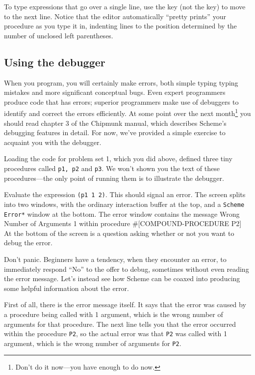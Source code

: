 To type expressions that go over a single line, use the 
key (not the  key) to move to the next line.  Notice that
the editor automatically ``pretty prints'' your procedure as you type
it in, indenting lines to the position determined by the number of
unclosed left parentheses.

\subsection{Using the debugger}

When you program, you will certainly make errors, both simple typing
typing mistakes and more significant conceptual bugs.  Even expert
programmers produce code that has errors; superior programmers make
use of debuggers to identify and correct the errors efficiently.  At
some point over the next month\footnote{Don't do it now---you have
enough to do now.} you should read chapter 3 of the Chipmunk manual,
which describes Scheme's debugging features in detail.  For now, we've
provided a simple exercise to acquaint you with the debugger.

Loading the code for problem set 1, which you did above, defined three
tiny procedures called {\tt p1, p2} and {\tt p3}.  We won't shown you
the text of these procedures---the only point of running them is to
illustrate the debugger.

Evaluate the expression {\tt (p1 1 2)}.  This should signal an error.
The screen splits into two windows, with the ordinary interaction
buffer at the top, and a {\tt *Scheme Error*} window at the bottom.
The error window contains the message
\beginlisp
Wrong Number of Arguments 1
within procedure \#[COMPOUND-PROCEDURE P2]
\endlisp
At the bottom of the screen is a question asking whether or not you
want to debug the error.

Don't panic.  Beginners have a tendency, when they encounter an error,
to immediately respond ``No'' to the offer to debug, sometimes without
even reading the error message.  Let's instead see how Scheme can be
coaxed into producing some helpful information about the error.

First of all, there is the error message itself.  It says that the
error was caused by a procedure being called with 1 argument, which is
the wrong number of arguments for that procedure.  The next line tells
you that the error occurred within the procedure {\tt P2}, so the
actual error was that {\tt P2} was called with 1 argument, which is
the wrong number of arguments for {\tt P2}.

